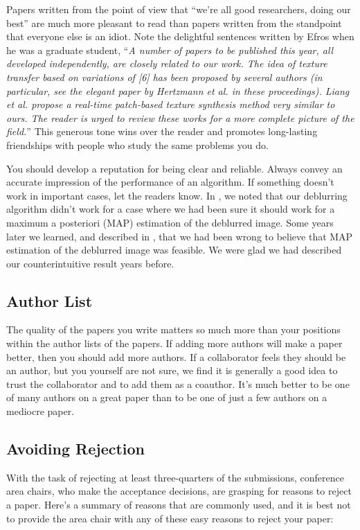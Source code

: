 Papers written from the point of view that ``we're all good researchers, doing our best'' are much more pleasant to read than papers written from the standpoint that everyone else is an idiot.  Note the delightful sentences written by Efros \cite{Efros01} when he was a graduate student, ``{\em A number of papers to be published this year, all developed independently, are closely related to our work.  The idea of texture transfer based on variations of [6] has been proposed by several authors (in particular, see the elegant paper by Hertzmann et al. in these proceedings).  Liang et al. propose a real-time patch-based texture synthesis method very similar to ours.  The reader is urged to review these works for a more complete picture of the field.}''  This generous tone wins over the reader and promotes long-lasting friendships with people who study the same problems you do.

You should develop a reputation for being clear and reliable.  Always convey an accurate impression of the performance of an algorithm.  If something doesn't work in important cases, let the readers know.  In \cite{Fergus2006}, we noted that our deblurring algorithm didn't work for a case where we had been sure it should work for a  maximum a posteriori (MAP)  estimation of the deblurred image. Some years later we learned, and described in \cite{Levin2011}, that we had been wrong to believe that MAP estimation of the deblurred image was feasible.  We were glad we had described our counterintuitive result years before.


\subsection{Author List}

The quality of the papers you write matters so much more than your positions within the author lists of the papers.  If adding more authors will make a paper better, then you should add more authors.   If a collaborator feels they should be an author, but you yourself are not sure, we find it is generally a good idea to trust the collaborator and to add them as a coauthor. It’s much better to be one of many authors on a great paper than to be one of just a few authors on a mediocre paper.

\subsection{Avoiding Rejection}

With the task of rejecting at least three-quarters of the submissions, conference area chairs, who make the acceptance decisions, are grasping for reasons to reject a paper.  Here’s a summary of reasons that are commonly used, and it is best not to provide the area chair with any of these easy reasons to reject your paper:

